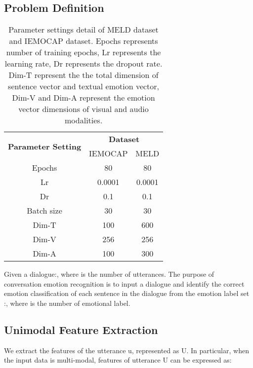 \documentclass[11pt]{article}
\begin{document}
\subsection{Problem Definition}
\begin{table}[]
	\centering
	\begin{tabular}{c|c|c}
		\hline
		\multirow{2}{*}{\textbf{Parameter   Setting}} & \multicolumn{2}{c}{\textbf{Dataset}} \\ \cline{2-3} 
		& IEMOCAP            & MELD             \\ \hline
		Epochs                                        & 80                 & 80               \\
		Lr                                            & 0.0001             & 0.0001           \\
		Dr                                            & 0.1                & 0.1              \\
		Batch size                                    & 30                 & 30               \\
		Dim-T                                         & 100                & 600              \\
		Dim-V                                         & 256                & 256              \\
		Dim-A                                         & 100                & 300              \\ \hline
	\end{tabular}
	\caption{ Parameter settings detail of MELD dataset and IEMOCAP dataset. Epochs represents number of training epochs, Lr represents the learning rate, Dr represents the dropout rate. Dim-T represent the the total dimension of sentence vector and textual emotion vector, Dim-V and Dim-A represent the emotion vector dimensions of visual and audio modalities.}
\end{table}
Given a dialogue:{}, where  is the number of utterances. The purpose of conversation emotion recognition is to input a dialogue and identify the correct emotion classification of each sentence in the dialogue from the emotion label set :{}, where  is the number of emotional label. 
\subsection{Unimodal Feature Extraction}

We extract the features of the utterance u, represented as U. In particular, when the input data is multi-modal, features of utterance U can be expressed as:
	
\end{document}
